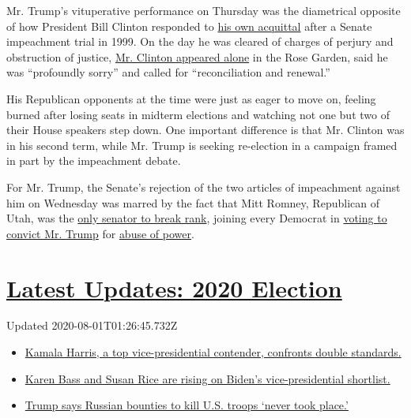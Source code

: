 Mr. Trump's vituperative performance on Thursday was the diametrical
opposite of how President Bill Clinton responded to
\href{https://www.washingtonpost.com/politics/clinton-impeachment/senate-acquits-president-clinton/}{his
own acquittal} after a Senate impeachment trial in 1999. On the day he
was cleared of charges of perjury and obstruction of justice,
\href{https://www.nytimes.com/1999/02/13/us/the-president-s-acquittal-clinton-statement.html}{Mr.
Clinton appeared alone} in the Rose Garden, said he was ``profoundly
sorry'' and called for ``reconciliation and renewal.''

His Republican opponents at the time were just as eager to move on,
feeling burned after losing seats in midterm elections and watching not
one but two of their House speakers step down. One important difference
is that Mr. Clinton was in his second term, while Mr. Trump is seeking
re-election in a campaign framed in part by the impeachment debate.

For Mr. Trump, the Senate's rejection of the two articles of impeachment
against him on Wednesday was marred by the fact that Mitt Romney,
Republican of Utah, was the
\href{https://www.nytimes.com/2020/02/05/us/politics/romney-trump-impeachment.html}{only
senator to break rank}, joining every Democrat in
\href{https://www.nytimes.com/2020/02/06/podcasts/the-daily/mitt-romney.html}{voting
to convict Mr. Trump} for
\href{https://www.nytimes.com/interactive/2020/01/22/us/politics/impeachment-articles-arguments.html}{abuse
of power}.

\hypertarget{latest-updates-2020-election}{%
\section{\texorpdfstring{\href{https://www.nytimes.com/2020/07/31/us/elections/biden-vs-trump.html?action=click\&pgtype=Article\&state=default\&region=MAIN_CONTENT_1\&context=storylines_live_updates}{Latest
Updates: 2020
Election}}{Latest Updates: 2020 Election}}\label{latest-updates-2020-election}}

Updated 2020-08-01T01:26:45.732Z

\begin{itemize}
\tightlist
\item
  \href{https://www.nytimes.com/2020/07/31/us/elections/biden-vs-trump.html?action=click\&pgtype=Article\&state=default\&region=MAIN_CONTENT_1\&context=storylines_live_updates\#link-29fdff45}{Kamala
  Harris, a top vice-presidential contender, confronts double
  standards.}
\item
  \href{https://www.nytimes.com/2020/07/31/us/elections/biden-vs-trump.html?action=click\&pgtype=Article\&state=default\&region=MAIN_CONTENT_1\&context=storylines_live_updates\#link-13ec3d9c}{Karen
  Bass and Susan Rice are rising on Biden's vice-presidential
  shortlist.}
\item
  \href{https://www.nytimes.com/2020/07/31/us/elections/biden-vs-trump.html?action=click\&pgtype=Article\&state=default\&region=MAIN_CONTENT_1\&context=storylines_live_updates\#link-49e9a016}{Trump
  says Russian bounties to kill U.S. troops `never took place.'}
\end{itemize}

